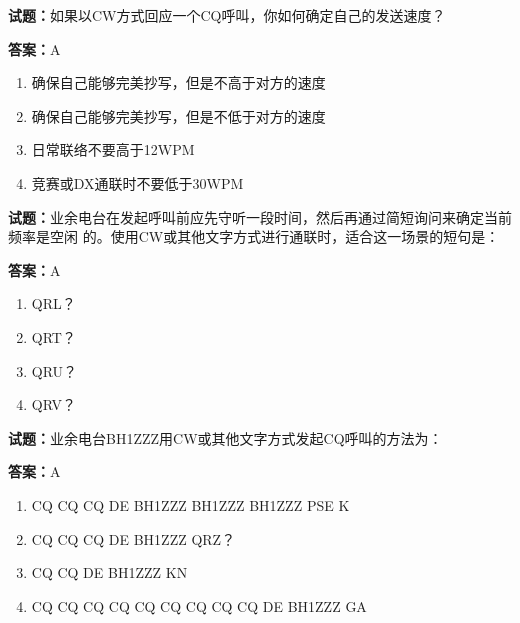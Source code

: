 \documentclass{ctexbook}
\begin{document}




\vspace{1em}

\textbf{试题：}如果以CW方式回应一个CQ呼叫，你如何确定自己的发送速度？ 

\textbf{答案：}A 

\begin{enumerate}[leftmargin=3em]
  \item 确保自己能够完美抄写，但是不高于对方的速度 

  \item 确保自己能够完美抄写，但是不低于对方的速度 

  \item 日常联络不要高于12WPM 

  \item 竞赛或DX通联时不要低于30WPM 

\end{enumerate}





\vspace{1em}

\textbf{试题：}业余电台在发起呼叫前应先守听一段时间，然后再通过简短询问来确定当前频率是空闲
的。使用CW或其他文字方式进行通联时，适合这一场景的短句是： 

\textbf{答案：}A 

\begin{enumerate}[leftmargin=3em]
  \item QRL？ 

  \item QRT？ 

  \item QRU？ 

  \item QRV？ 

\end{enumerate}





\vspace{1em}

\textbf{试题：}业余电台BH1ZZZ用CW或其他文字方式发起CQ呼叫的方法为： 

\textbf{答案：}A 

\begin{enumerate}[leftmargin=3em]
  \item CQ CQ CQ DE BH1ZZZ BH1ZZZ BH1ZZZ PSE K 

  \item CQ CQ CQ DE BH1ZZZ QRZ？ 

  \item CQ CQ DE BH1ZZZ KN 

  \item CQ CQ CQ CQ CQ CQ CQ CQ CQ DE BH1ZZZ GA 

\end{enumerate}
\end{document}
